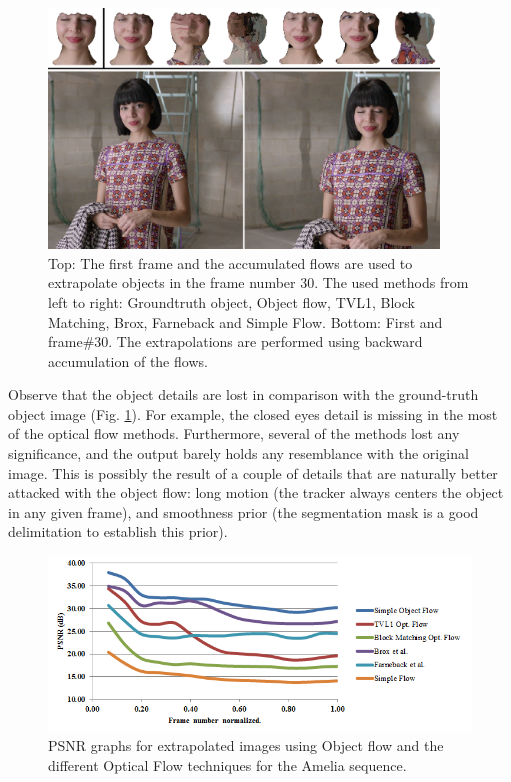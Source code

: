    \begin{figure}[t]
      \centering
      \includegraphics[width=0.925\textwidth]{../images/compare2.png}
      \caption{Top: The first frame and the accumulated flows are used to extrapolate objects in the frame number 30. The used methods from left to right: Groundtruth object, Object flow, TVL1, Block Matching, Brox, Farneback and Simple Flow. 
		Bottom: First and frame\#30. The extrapolations are performed using backward accumulation of the flows.}
      \label{compare2}
   \end{figure}


Observe that the object details are lost in comparison with the ground-truth object image (Fig. \ref{compare2}). For example, the closed eyes detail is missing in the most of the optical 
flow methods. Furthermore, several of the methods lost any significance, and the output barely holds any resemblance with the original image. This is possibly the result of a couple of details that are naturally better attacked with the object flow: 
long motion (the tracker always centers the object in any given frame), and smoothness prior (the segmentation mask is a 
good delimitation to establish this prior).

   \begin{figure}[th]
      \centering
      \includegraphics[width=1.0\textwidth]{../images/psnr2.png}
      \caption{PSNR graphs for extrapolated images using Object flow and the different Optical Flow techniques for the Amelia sequence. }
      \label{of_res2}
   \end{figure}

